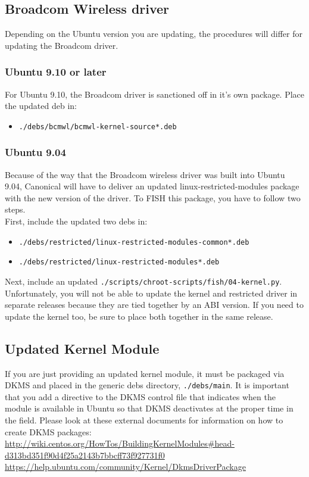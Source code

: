 \documentclass[letterpaper,10pt,titlepage]{article}
\begin{document}
\subsection{Broadcom Wireless driver}
Depending on the Ubuntu version you are updating, the procedures will differ for updating the Broadcom driver.

\subsubsection{Ubuntu 9.10 or later}
For Ubuntu 9.10, the Broadcom driver is sanctioned off in it's own package.  Place the updated deb in:
\begin{itemize}
\item \texttt{./debs/bcmwl/bcmwl-kernel-source*.deb}
\end{itemize}

\subsubsection{Ubuntu 9.04}
Because of the way that the Broadcom wireless driver was built into Ubuntu 9.04, Canonical will have to deliver an updated linux-restricted-modules package with the new version of the driver.  To FISH this package, you have to follow two steps.
\\
First, include the updated two debs in:
\begin{itemize}
\item \texttt{./debs/restricted/linux-restricted-modules-common*.deb}
\item \texttt{./debs/restricted/linux-restricted-modules*.deb}
\end{itemize}
Next, include an updated \texttt{./scripts/chroot-scripts/fish/04-kernel.py}.  Unfortunately, you will not be able to update the kernel and restricted driver in separate releases because they are tied together by an ABI version.  If you need to update the kernel too, be sure to place both together in the same release.

\subsection{Updated Kernel Module}
If you are just providing an updated kernel module, it must be packaged via DKMS and placed in the generic debs directory, \texttt{./debs/main}.  It is important that you add a directive to the DKMS control file that indicates when the module is available in Ubuntu so that DKMS deactivates at the proper time in the field.
Please look at these external documents for information on how to create DKMS packages:
\linebreak 
\url{http://wiki.centos.org/HowTos/BuildingKernelModules#head-d313bd351f90d4f25a2143b7bbcff73f927731f0}
\linebreak
\url{https://help.ubuntu.com/community/Kernel/DkmsDriverPackage}
\end{document}
